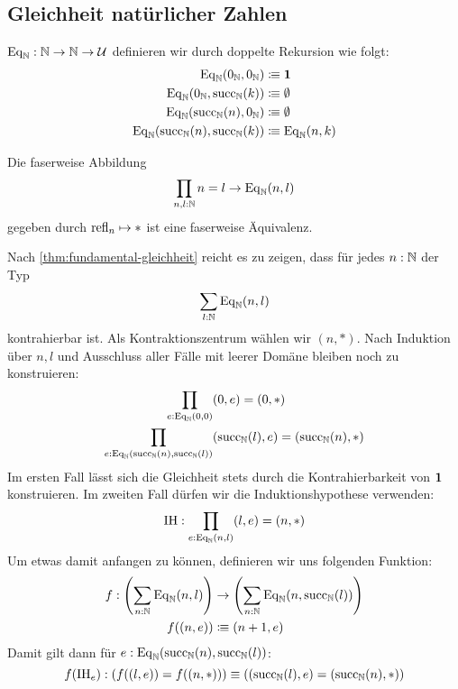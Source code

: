 \subsection{Gleichheit natürlicher Zahlen}
\label{sec:zahlen-gleichheit}
\begin{definition}
  $\mathrm{Eq}_{\mathbb{N}}:\mathbb{N}\to\mathbb{N}\to\mathcal{U}$ definieren wir durch doppelte Rekursion wie folgt:
  \begin{align*}
    \mathrm{Eq}_{\mathbb{N}}(0_{\mathbb{N}},    0_{\mathbb{N}})     &\vcentcolon\mspace{-1.2mu}\equiv\mathbf{1} \\
    \mathrm{Eq}_{\mathbb{N}}(0_{\mathbb{N}},    \mathrm{succ}_{\mathbb{N}}(k)) &\vcentcolon\mspace{-1.2mu}\equiv\emptyset \\
    \mathrm{Eq}_{\mathbb{N}}(\mathrm{succ}_{\mathbb{N}}(n),0_{\mathbb{N}})     &\vcentcolon\mspace{-1.2mu}\equiv\emptyset \\
    \mathrm{Eq}_{\mathbb{N}}(\mathrm{succ}_{\mathbb{N}}(n),\mathrm{succ}_{\mathbb{N}}(k)) &\vcentcolon\mspace{-1.2mu}\equiv\mathrm{Eq}_{\mathbb{N}}(n,k) 
  \end{align*}
\end{definition}

\begin{theorem}
  \label{thm:gleichheit-nat}
  Die faserweise Abbildung
  \[
    \prod_{n,l:\mathbb{N}}n=l\to \mathrm{Eq}_{\mathbb{N}}(n,l)
  \]
  gegeben durch $\mathrm{refl}_n\mapsto \ast$ ist eine faserweise Äquivalenz.
\end{theorem}
\begin{beweis}
  Nach \cref{thm:fundamental-gleichheit} reicht es zu zeigen, dass für jedes $n:\mathbb{N}$ der Typ
  \[
    \sum_{l:\mathbb{N}}\mathrm{Eq}_{\mathbb{N}}(n,l)
  \]
  kontrahierbar ist. Als Kontraktionszentrum wählen wir $(n,\ast)$.
  Nach Induktion über $n, l$ und Ausschluss aller Fälle mit leerer Domäne bleiben noch zu konstruieren:
  \begin{align*}
    \prod_{e:\mathrm{Eq}_{\mathbb{N}}(0,0)} & (0,e)=(0,\ast) \\
    \prod_{e:\mathrm{Eq}_{\mathbb{N}}(\mathrm{succ}_{\mathbb{N}}(n),\mathrm{succ}_{\mathbb{N}}(l))} & (\mathrm{succ}_{\mathbb{N}}(l),e)=(\mathrm{succ}_{\mathbb{N}}(n),\ast)
  \end{align*}
  Im ersten Fall lässt sich die Gleichheit stets durch die Kontrahierbarkeit von $\mathbf{1}$ konstruieren.
  Im zweiten Fall dürfen wir die Induktionshypothese verwenden:
  \[
    \mathrm{IH}:\prod_{e:\mathrm{Eq}_{\mathbb{N}}(n,l)}(l,e)=(n,\ast)
  \]
  Um etwas damit anfangen zu können, definieren wir uns folgenden Funktion:
  \begin{align*}
    f:\left(\sum_{n:\mathbb{N}}\mathrm{Eq}_{\mathbb{N}}(n,l)\right)&\to \left(\sum_{n:\mathbb{N}}\mathrm{Eq}_{\mathbb{N}}(n,\mathrm{succ}_{\mathbb{N}}(l))\right) \\
    f((n,e))&\vcentcolon\mspace{-1.2mu}\equiv (n+1,e)
  \end{align*}
  Damit gilt dann für $e:\mathrm{Eq}_{\mathbb{N}}(\mathrm{succ}_{\mathbb{N}}(n),\mathrm{succ}_{\mathbb{N}}(l))$:
  \[
    f(\mathrm{IH}_e):\left(f((l,e))=f((n,\ast))\right)\equiv \left((\mathrm{succ}_{\mathbb{N}}(l),e)=(\mathrm{succ}_{\mathbb{N}}(n),\ast)\right)
  \]
\end{beweis}

